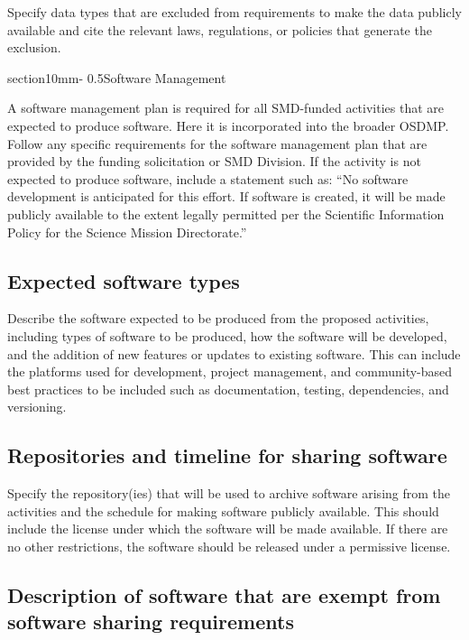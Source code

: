 \documentclass[letterpaper,12pt]{article}
\makeatletter
\renewcommand{\section}{\@startsection%
{section}{1}{0mm}{-\baselineskip}%
{0.5\baselineskip}{\normalfont\Large\bfseries}}%
\makeatother
\begin{document}
Specify data types that are excluded from requirements to make the data publicly available and cite the relevant laws, regulations, or policies that generate the exclusion.

\section{Software Management}

A software management plan is required for all SMD-funded activities that are expected to produce software. Here it is incorporated into the broader OSDMP. Follow any specific requirements for the software management plan that are provided by the funding solicitation or SMD Division. If the activity is not expected to produce software, include a statement such as: “No software development is anticipated for this effort. If software is created, it will be made publicly available to the extent legally permitted per the Scientific Information Policy for the Science Mission Directorate.”

\subsection{Expected software types}

Describe the software expected to be produced from the proposed activities, including types of software to be produced, how the software will be developed, and the addition of new features or updates to existing software. This can include the platforms used for development, project management, and community-based best practices to be included such as documentation, testing, dependencies, and versioning.

\subsection{Repositories and timeline for sharing software}

Specify the repository(ies) that will be used to archive software arising from the activities and the schedule for making software publicly available. This should include the license under which the software will be made available. If there are no other restrictions, the software should be released under a permissive license.

\subsection{Description of software that are exempt from software sharing requirements}
\end{document}
